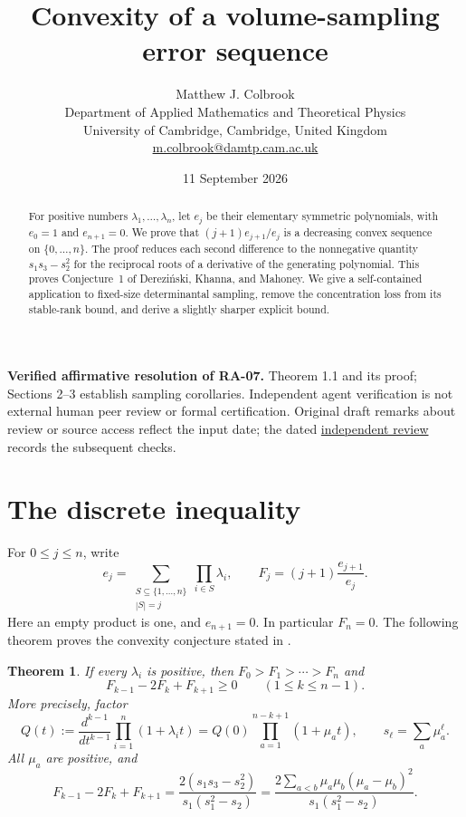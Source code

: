 \documentclass[11pt]{article}
\title{Convexity of a volume-sampling error sequence}
\author{Matthew J. Colbrook\\\small Department of Applied Mathematics and Theoretical Physics\\\small University of Cambridge, Cambridge, United Kingdom\\\small\href{mailto:m.colbrook@damtp.cam.ac.uk}{m.colbrook@damtp.cam.ac.uk}}
\date{11 September 2026}
\newtheorem{theorem}{Theorem}[section]
\theoremstyle{definition}
\begin{document}
\maketitle

\noindent\textbf{Verified affirmative resolution of RA-07.} Theorem 1.1 and its proof; Sections 2--3 establish sampling corollaries.
Independent agent verification is not external human peer review or formal certification. Original draft remarks about review or source access reflect the input date; the dated \href{https://github.com/MColbrook/OpenProblemsInNLA/blob/codex/colbrook-transfer-resolutions/references/colbrook-transfer-2026-09-11/verification/reviews/RA-07-review.md}{independent review} records the subsequent checks.
\par\medskip
\begin{abstract}
For positive numbers $\lambda_1,\ldots,\lambda_n$, let $e_j$ be their elementary symmetric polynomials, with $e_0=1$ and $e_{n+1}=0$. We prove that $(j+1)e_{j+1}/e_j$ is a decreasing convex sequence on $\{0,\ldots,n\}$. The proof reduces each second difference to the nonnegative quantity $s_1s_3-s_2^2$ for the reciprocal roots of a derivative of the generating polynomial. This proves Conjecture~1 of Derezi\'nski, Khanna, and Mahoney. We give a self-contained application to fixed-size determinantal sampling, remove the concentration loss from its stable-rank bound, and derive a slightly sharper explicit bound.
\end{abstract}

\section{The discrete inequality}
For $0\le j\le n$, write
\[
 e_j=\sum_{\substack{S\subseteq\{1,\ldots,n\}\\|S|=j}}
       \prod_{i\in S}\lambda_i,
 \qquad F_j=(j+1)\frac{e_{j+1}}{e_j}.
\]
Here an empty product is one, and $e_{n+1}=0$. In particular $F_n=0$. The following theorem proves the convexity conjecture stated in \cite[Section~5, Conjecture~1]{DKM2020}.

\begin{theorem}\label{thm:convex}
If every $\lambda_i$ is positive, then $F_0>F_1>\cdots>F_n$ and
\[
 F_{k-1}-2F_k+F_{k+1}\ge0\qquad(1\le k\le n-1).
\]
More precisely, factor
\[
 Q(t):=\frac{d^{k-1}}{dt^{k-1}}\prod_{i=1}^n(1+\lambda_i t)
     =Q(0)\prod_{a=1}^{n-k+1}(1+\mu_a t),
 \qquad s_\ell=\sum_a\mu_a^\ell.
\]
All $\mu_a$ are positive, and
\begin{equation}\label{eq:certificate}
 F_{k-1}-2F_k+F_{k+1}
 =\frac{2(s_1s_3-s_2^2)}{s_1(s_1^2-s_2)}
 =\frac{2\sum_{a<b}\mu_a\mu_b(\mu_a-\mu_b)^2}
        {s_1(s_1^2-s_2)}.
\end{equation}
\end{theorem}
\end{document}

